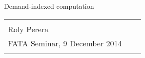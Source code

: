\begin{frame}

{\huge{Demand-indexed computation}}

{\footnotesize
\begin{tabularx}{0.85\textwidth}{@{}XXX@{}}
\\
\\
Roly Perera \\
FATA Seminar, 9 December 2014
\\
\\
\end{tabularx}
}
\end{frame}
